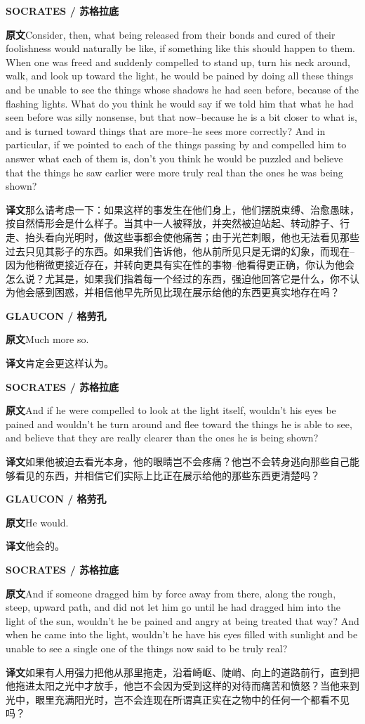 \documentclass[UTF8,zihao=-4]{ctexart}
\newcommand{\BodyFont}{\fontsize{10.5pt}{15.5pt}\selectfont}
\newcommand{\origlabel}{\textbf{原文}\quad}
\newcommand{\translabel}{\textbf{译文}\quad}
\newenvironment{enblock}{\par\noindent\begingroup\BodyFont\origlabel}{\par\endgroup}
\newenvironment{zhblock}{\par\noindent\begingroup\BodyFont\translabel}{\par\endgroup\vspace{0.35em}}
\newcommand{\en}[1]{\begin{enblock}#1\end{enblock}}
\newcommand{\zh}[1]{\begin{zhblock}#1\end{zhblock}}
\newcommand{\speaker}[2]{\par\medskip\noindent\textbf{#1 / #2}\par}
\begin{document}
\speaker{SOCRATES}{苏格拉底}
\en{Consider, then, what being released from their bonds and cured of their foolishness would naturally be like, if something like this should happen to them. When one was freed and suddenly compelled to stand up, turn his neck around, walk, and look up toward the light, he would be pained by doing all these things and be unable to see the things whose shadows he had seen before, because of the flashing lights. What do you think he would say if we told him that what he had seen before was silly nonsense, but that now--because he is a bit closer to what is, and is turned toward things that are more--he sees more correctly? And in particular, if we pointed to each of the things passing by and compelled him to answer what each of them is, don't you think he would be puzzled and believe that the things he saw earlier were more truly real than the ones he was being shown?}
\zh{那么请考虑一下：如果这样的事发生在他们身上，他们摆脱束缚、治愈愚昧，按自然情形会是什么样子。当其中一人被释放，并突然被迫站起、转动脖子、行走、抬头看向光明时，做这些事都会使他痛苦；由于光芒刺眼，他也无法看见那些过去只见其影子的东西。如果我们告诉他，他从前所见只是无谓的幻象，而现在--因为他稍微更接近存在，并转向更具有实在性的事物--他看得更正确，你认为他会怎么说？尤其是，如果我们指着每一个经过的东西，强迫他回答它是什么，你不认为他会感到困惑，并相信他早先所见比现在展示给他的东西更真实地存在吗？}

\speaker{GLAUCON}{格劳孔}
\en{Much more so.}
\zh{肯定会更这样认为。}

\speaker{SOCRATES}{苏格拉底}
\en{And if he were compelled to look at the light itself, wouldn't his eyes be pained and wouldn't he turn around and flee toward the things he is able to see, and believe that they are really clearer than the ones he is being shown?}
\zh{如果他被迫去看光本身，他的眼睛岂不会疼痛？他岂不会转身逃向那些自己能够看见的东西，并相信它们实际上比正在展示给他的那些东西更清楚吗？}

\speaker{GLAUCON}{格劳孔}
\en{He would.}
\zh{他会的。}

\speaker{SOCRATES}{苏格拉底}
\en{And if someone dragged him by force away from there, along the rough, steep, upward path, and did not let him go until he had dragged him into the light of the sun, wouldn't he be pained and angry at being treated that way? And when he came into the light, wouldn't he have his eyes filled with sunlight and be unable to see a single one of the things now said to be truly real?}
\zh{如果有人用强力把他从那里拖走，沿着崎岖、陡峭、向上的道路前行，直到把他拖进太阳之光中才放手，他岂不会因为受到这样的对待而痛苦和愤怒？当他来到光中，眼里充满阳光时，岂不会连现在所谓真正实在之物中的任何一个都看不见吗？}
\end{document}
